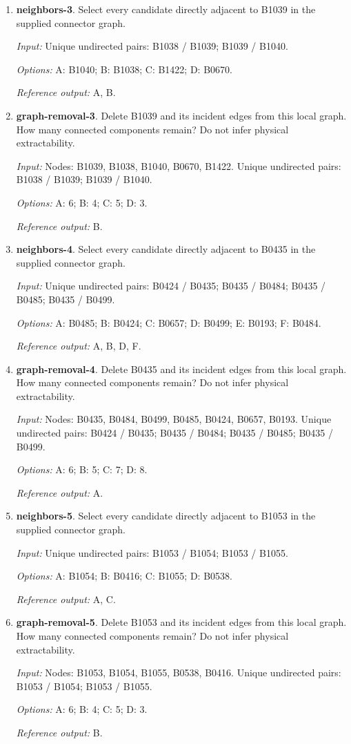 \begin{enumerate}
\item \textbf{neighbors-3}. Select every candidate directly adjacent to B1039 in the supplied connector graph.\par {\small \textit{Input:} Unique undirected pairs: B1038 / B1039; B1039 / B1040. \par\textit{Options:} A: B1040; B: B1038; C: B1422; D: B0670. \par\textit{Reference output:} A, B.}
\item \textbf{graph-removal-3}. Delete B1039 and its incident edges from this local graph. How many connected components remain? Do not infer physical extractability.\par {\small \textit{Input:} Nodes: B1039, B1038, B1040, B0670, B1422. Unique undirected pairs: B1038 / B1039; B1039 / B1040. \par\textit{Options:} A: 6; B: 4; C: 5; D: 3. \par\textit{Reference output:} B.}
\item \textbf{neighbors-4}. Select every candidate directly adjacent to B0435 in the supplied connector graph.\par {\small \textit{Input:} Unique undirected pairs: B0424 / B0435; B0435 / B0484; B0435 / B0485; B0435 / B0499. \par\textit{Options:} A: B0485; B: B0424; C: B0657; D: B0499; E: B0193; F: B0484. \par\textit{Reference output:} A, B, D, F.}
\item \textbf{graph-removal-4}. Delete B0435 and its incident edges from this local graph. How many connected components remain? Do not infer physical extractability.\par {\small \textit{Input:} Nodes: B0435, B0484, B0499, B0485, B0424, B0657, B0193. Unique undirected pairs: B0424 / B0435; B0435 / B0484; B0435 / B0485; B0435 / B0499. \par\textit{Options:} A: 6; B: 5; C: 7; D: 8. \par\textit{Reference output:} A.}
\item \textbf{neighbors-5}. Select every candidate directly adjacent to B1053 in the supplied connector graph.\par {\small \textit{Input:} Unique undirected pairs: B1053 / B1054; B1053 / B1055. \par\textit{Options:} A: B1054; B: B0416; C: B1055; D: B0538. \par\textit{Reference output:} A, C.}
\item \textbf{graph-removal-5}. Delete B1053 and its incident edges from this local graph. How many connected components remain? Do not infer physical extractability.\par {\small \textit{Input:} Nodes: B1053, B1054, B1055, B0538, B0416. Unique undirected pairs: B1053 / B1054; B1053 / B1055. \par\textit{Options:} A: 6; B: 4; C: 5; D: 3. \par\textit{Reference output:} B.}

\end{enumerate}
